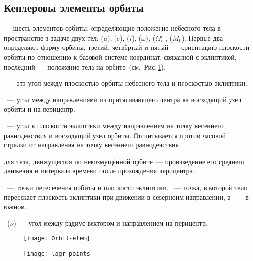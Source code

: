 \subsection{Кеплеровы элементы орбиты}

 --- шесть элементов орбиты, определяющие положение небесного тела в пространстве в задаче двух тел:  ($a$),  ($e$),  ($i$),  ($\omega$),  ($\Omega$) ,  ($M_0$). Первые два определяют форму орбиты, третий, четвёртый и пятый~--- ориентацию плоскости орбиты по отношению к базовой системе координат, связанной с эклиптикой, последний~--- положение тела на орбите~(см.~Рис.\,\ref{fig:orb-elem}).

~--- это угол между плоскостью орбиты небесного тела и плоскостью эклиптики.

~--- угол между направлениями из притягивающего центра на восходящий узел орбиты и на перицентр.

~--- угол в плоскости эклиптики между направлением на точку весеннего равноденствия и восходящий узел орбиты. Отсчитывается против часовой стрелки от направления на точку весеннего равноденствия.

 для тела, движущегося по невозмущённой орбите~--- произведение его среднего движения и интервала времени после прохождения перицентра.

~--- точки пересечения орбиты и плоскости эклиптики. ~--- точка, в которой тело пересекает плоскость эклиптики при движении в северноим направлении, а ~--- в южном.

~($\nu$)~--- угол между радиус вектором и направлением на перицентр.

\begin{figure}[h!]
\begin{minipage}[b]{0.49\tw}
	\centering
	\texttt{[image: Orbit-elem]}
	\label{fig:orb-elem}
\end{minipage}
\hfill
\begin{minipage}[b]{0.49\tw}
	\centering
	\texttt{[image: lagr-points]}
\end{minipage}
\end{figure}